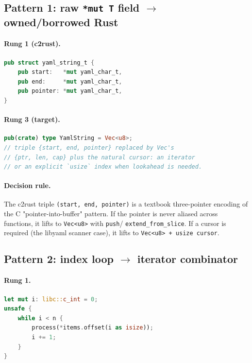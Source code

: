 \documentclass[12pt]{article}
\theoremstyle{definition}
\theoremstyle{remark}
\begin{document}
\subsection{Pattern 1: raw \texttt{*mut T} field $\to$ owned/borrowed Rust}

\paragraph{Rung 1 (c2rust).}
\begin{lstlisting}[language=Rust]
pub struct yaml_string_t {
    pub start:   *mut yaml_char_t,
    pub end:     *mut yaml_char_t,
    pub pointer: *mut yaml_char_t,
}
\end{lstlisting}

\paragraph{Rung 3 (target).}
\begin{lstlisting}[language=Rust]
pub(crate) type YamlString = Vec<u8>;
// triple {start, end, pointer} replaced by Vec's
// {ptr, len, cap} plus the natural cursor: an iterator
// or an explicit `usize` index when lookahead is needed.
\end{lstlisting}

\paragraph{Decision rule.} The c2rust triple
\texttt{(start, end, pointer)} is a textbook three-pointer encoding of
the C "pointer-into-buffer" pattern. If the pointer is never aliased
across functions, it lifts to \texttt{Vec<u8>} with \texttt{push}/
\texttt{extend\_from\_slice}. If a cursor is required (the libyaml
scanner case), it lifts to \texttt{Vec<u8> + usize cursor}.

\subsection{Pattern 2: index loop $\to$ iterator combinator}

\paragraph{Rung 1.}
\begin{lstlisting}[language=Rust]
let mut i: libc::c_int = 0;
unsafe {
    while i < n {
        process(*items.offset(i as isize));
        i += 1;
    }
}
\end{lstlisting}
\end{document}
